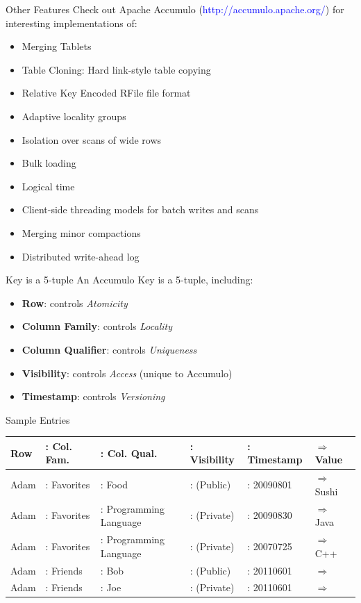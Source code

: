 \documentclass[t,landscape]{beamer}
\begin{document}
\begin{frame}{Other Features}
\scriptsize
Check out Apache Accumulo (\textcolor{blue}{http://accumulo.apache.org/}) for interesting implementations of:
\begin{itemize}
\item{Merging Tablets}
\item{Table Cloning: Hard link-style table copying}
\item{Relative Key Encoded RFile file format}
\item{Adaptive locality groups}
\item{Isolation over scans of wide rows}
\item{Bulk loading}
\item{Logical time}
\item{Client-side threading models for batch writes and scans}
\item{Merging minor compactions}
\item{Distributed write-ahead log}
\end{itemize}
\end{frame}

\begin{frame}[label=current]{Key is a 5-tuple}
An Accumulo Key is a 5-tuple, including:
\begin{itemize}
  \item{\textbf{Row}: controls \emph{Atomicity}}
  \item{\textbf{Column Family}: controls \emph{Locality}}
  \item{\textbf{Column Qualifier}: controls \emph{Uniqueness}}
  \item{\textbf{Visibility}: controls \emph{Access} (unique to Accumulo)}
  \item{\textbf{Timestamp}: controls \emph{Versioning}}
\end{itemize}

\begin{block}{Sample Entries}
\tiny
\begin{tabular}{llllll}
Row &: Col. Fam. &: Col. Qual. &: Visibility &: Timestamp & $\Rightarrow$ Value \\\hline
Adam &: Favorites &: Food &: (Public) &: 20090801 &$\Rightarrow$ Sushi \\
Adam &: Favorites &: Programming Language &: (Private) &: 20090830 &$\Rightarrow$ Java \\
Adam &: Favorites &: Programming Language &: (Private) &: 20070725 &$\Rightarrow$ C++ \\
Adam &: Friends &: Bob &: (Public) &: 20110601 & $\Rightarrow$ \\
Adam &: Friends &: Joe &: (Private) &: 20110601 & $\Rightarrow$ \\
\end{tabular}
\end{block}
\end{frame}
\end{document}
